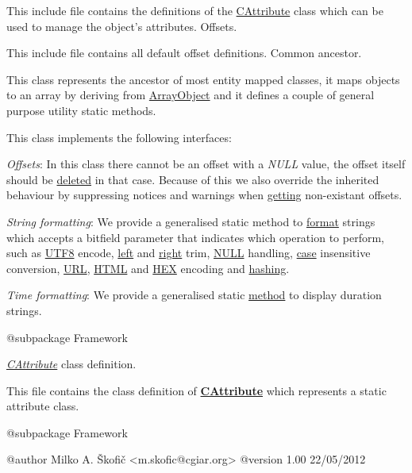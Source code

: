 This include file contains the definitions of the \hyperlink{class_c_attribute}{C\-Attribute} class which can be used to manage the object's attributes. Offsets.

This include file contains all default offset definitions. Common ancestor.

This class represents the ancestor of most entity mapped classes, it maps objects to an array by deriving from \hyperlink{}{Array\-Object} and it defines a couple of general purpose utility static methods.

This class implements the following interfaces\-:


\begin{DoxyItemize}
\item {\itshape Offsets}\-: In this class there cannot be an offset with a {\itshape N\-U\-L\-L} value, the offset itself should be \hyperlink{}{deleted} in that case. Because of this we also override the inherited behaviour by suppressing notices and warnings when \hyperlink{}{getting} non-\/existant offsets. 
\item {\itshape String formatting}\-: We provide a generalised static method to \hyperlink{}{format} strings which accepts a bitfield parameter that indicates which operation to perform, such as \hyperlink{}{U\-T\-F8} encode, \hyperlink{}{left} and \hyperlink{}{right} trim, \hyperlink{}{N\-U\-L\-L} handling, \hyperlink{}{case} insensitive conversion, \hyperlink{}{U\-R\-L}, \hyperlink{}{H\-T\-M\-L} and \hyperlink{}{H\-E\-X} encoding and \hyperlink{}{hashing}. 
\item {\itshape Time formatting}\-: We provide a generalised static \hyperlink{}{method} to display duration strings. 
\end{DoxyItemize}

\begin{DoxyVerb} @subpackage        Framework\end{DoxyVerb}


{\itshape \hyperlink{class_c_attribute}{C\-Attribute}} class definition.

This file contains the class definition of {\bfseries \hyperlink{class_c_attribute}{C\-Attribute}} which represents a static attribute class.

\begin{DoxyVerb} @subpackage        Framework

 @author            Milko A. Škofič <m.skofic@cgiar.org>
 @version   1.00 22/05/2012\end{DoxyVerb}


